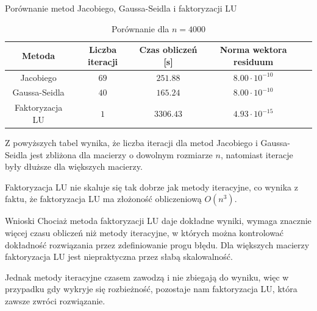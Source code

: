 \documentclass{article}
\begin{document}
\begin{section}{Porównanie metod Jacobiego, Gaussa-Seidla i faktoryzacji LU}
    \begin{table}
        \centering
        \begin{tabular}{|c|c|c|c|c|}
            \hline
            Metoda & Liczba iteracji & Czas obliczeń [s] & Norma wektora residuum \\
            \hline
            Jacobiego & $69$ & $251.88$ & $8.00\cdot10^{-10}$ \\
            Gaussa-Seidla & $40$ & $165.24$ & $8.00\cdot10^{-10}$ \\
            Faktoryzacja LU & $1$ & $3306.43$ & $4.93\cdot10^{-15}$ \\
            \hline
        \end{tabular}
        \caption{Porównanie dla $n = 4000$}
    \end{table}

    Z powyższych tabel wynika, że liczba iteracji dla metod Jacobiego i Gaussa-Seidla jest zbliżona dla
    macierzy o dowolnym rozmiarze $n$, natomiast iteracje były dłuższe dla większych macierzy.

    Faktoryzacja LU nie skaluje się tak dobrze jak metody iteracyjne, co wynika z faktu, że faktoryzacja LU
    ma złożoność obliczeniową $O(n^3)$. 
\end{section}

\begin{section}{Wnioski}
    Chociaż metoda faktoryzacji LU daje dokładne wyniki, wymaga znacznie więcej czasu obliczeń niż metody iteracyjne,
    w których można kontrolować dokładność rozwiązania przez zdefiniowanie progu błędu. Dla większych macierzy
    faktoryzacja LU jest niepraktyczna przez słabą skalowalność. 

    Jednak metody iteracyjne czasem zawodzą i nie zbiegają do wyniku, więc w przypadku gdy wykryje się rozbieżność,
    pozostaje nam faktoryzacja LU, która zawsze zwróci rozwiązanie.
\end{section}

\printbibliography
\end{document}
